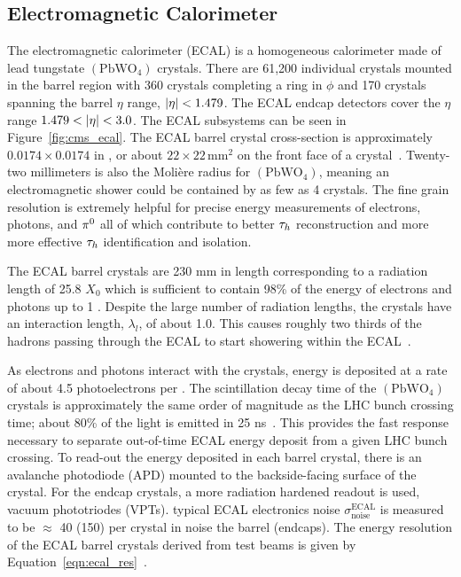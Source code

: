 \subsection{Electromagnetic Calorimeter}
The electromagnetic calorimeter (ECAL) is a homogeneous calorimeter made of lead 
tungstate $(\textrm{PbWO}_{4})$ crystals. There are 61,200 individual crystals mounted
in the barrel region with 360 crystals completing a ring in $\phi$ and 170 crystals
spanning the barrel $\eta$ range, $\lvert\eta\rvert < 1.479$. 
The ECAL endcap detectors cover the $\eta$ range $1.479 < \lvert\eta\rvert < 3.0$. The
ECAL subsystems can be seen in Figure~\ref{fig:cms_ecal}.
The ECAL barrel crystal cross-section is approximately $0.0174 \times 0.0174$ 
in \etaphi, or about $22 \times 22 \, \textrm{mm}^{2}$
on the front face of a crystal~\cite{Chatrchyan:2008zzk}. Twenty-two millimeters is also the Moli\`ere radius
for $(\textrm{PbWO}_{4})$, meaning an electromagnetic shower could be
contained by as few as 4 crystals. The fine grain resolution is extremely
helpful for precise energy measurements of electrons, photons, and $\pi^{0}$ all of which
contribute to better $\tau_{h}$ reconstruction and more more effective
$\tau_{h}$ identification and isolation.

The ECAL barrel crystals are 230 mm in length corresponding to a
radiation length of 25.8 $X_{0}$ which is sufficient to contain 98\% of the energy
of electrons and photons up to 1 \TeV. Despite the large number of radiation lengths,
the crystals have an interaction length, $\lambda_{l}$, of about 1.0. This causes
roughly two thirds of the hadrons passing through the ECAL to start showering
within the ECAL~\cite{Chatrchyan:2008zzk}. 

As electrons and photons interact with the crystals, energy is deposited at a rate of about 4.5
photoelectrons per \MeV.
The scintillation decay time of the $(\textrm{PbWO}_{4})$ crystals is approximately the
same order of magnitude as the LHC bunch crossing time; about 80\% of the light is 
emitted in 25 ns~\cite{dafinei_auffray_lecoq_schneegans_1994}.
This provides the fast response necessary to separate out-of-time ECAL energy deposit
from a given LHC bunch crossing. To read-out the energy deposited in each barrel
crystal, there is an avalanche photodiode (APD) mounted to the backside-facing surface
of the crystal. For the endcap crystals, a more radiation hardened readout is used,
vacuum phototriodes (VPTs). typical ECAL electronics noise 
$\sigma ^{\text{ECAL}} _{\text{noise}}$ is measured to be $\approx$ 40 (150) \MeV 
per crystal in noise the barrel (endcaps).
The energy resolution of the ECAL barrel crystals derived from test beams is given by
Equation~\ref{eqn:ecal_res}~\cite{1748-0221-8-09-P09009}.

